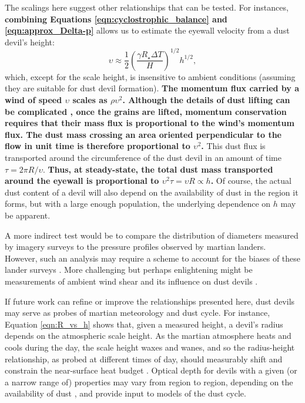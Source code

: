 \documentclass{aastex63}
\begin{document}
The scalings here suggest other relationships that can be tested. For instances, {\bf combining Equations \ref{eqn:cyclostrophic_balance} and \ref{eqn:approx_Delta-p}} allows us to estimate the eyewall velocity from a dust devil's height:
\begin{equation}
    \upsilon \approx \frac{1}{2} \left( \dfrac{\gamma R_\star \Delta T}{H} \right)^{1/2} h^{1/2},\label{eqn:velocity_vs_h}
\end{equation}
which, except for the scale height, is insensitive to ambient conditions (assuming they are suitable for dust devil formation). {\bf The momentum flux carried by a wind of speed $\upsilon$ scales as $\rho \upsilon^2$. Although the details of dust lifting can be complicated \citep[e.g.][]{1985wagp.book.....G}, once the grains are lifted, momentum conservation requires that their mass flux is proportional to the wind's momentum flux. The dust mass crossing an area oriented perpendicular to the flow in unit time is therefore proportional to $\upsilon^2$.} This dust flux is transported around the circumference of the dust devil in an amount of time $\tau = 2\pi R/\upsilon$. {\bf Thus, at steady-state, the total dust mass transported around the eyewall is proportional to $\upsilon^2\tau = \upsilon R \propto h$.} Of course, the actual dust content of a devil will also depend on the availability of dust in the region it forms, but with a large enough population, the underlying dependence on $h$ may be apparent. 

A more indirect test would be to compare the distribution of diameters measured by imagery surveys to the pressure profiles observed by martian landers. However, such an analysis may require a scheme to account for the biases of these lander surveys \citep{2018Icar..299..166J, 2019Icar..317..209K}. More challenging but perhaps enlightening might be measurements of ambient wind shear and its influence on dust devils \citep{arya1988}.

If future work can refine or improve the relationships presented here, dust devils may serve as probes of martian meteorology and dust cycle. For instance, Equation \ref{eqn:R_vs_h} shows that, given a measured height, a devil's radius depends on the atmospheric scale height. As the martian atmosphere heats and cools during the day, the scale height waxes and wanes, and so the radius-height relationship, as probed at different times of day, should measurably shift and constrain the near-surface heat budget \citep{Martinez2017}. Optical depth for devils with a given (or a narrow range of) properties may vary from region to region, depending on the availability of dust \citep{2002JGRE..107.5042B}, and provide input to models of the dust cycle.
\end{document}
